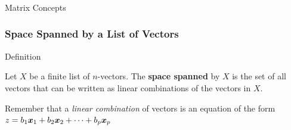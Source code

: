 \documentclass{beamer}
\begin{document}
\begin{frame}
  \frametitle{}
\begin{center}
\begin{Huge}
{\rmfamily Matrix Concepts}
\end{Huge}
\end{center}
\end{frame}










\begin{frame}
  \frametitle{Space Spanned by a List of Vectors}


\begin{block}{Definition}

Let $X$ be a finite list of $n$-vectors. The \textbf{space spanned} by $X$ is the set of all vectors that can be written as linear combinations of the vectors in $X$.
\medskip


\end{block}
\bigskip

Remember that a \emph{linear combination} of vectors is an equation of the form $z = b_1 \bm{x}_1 + b_2 \bm{x}_2 + \cdots + b_p \bm{x}_p$

\end{frame}

\end{document}
